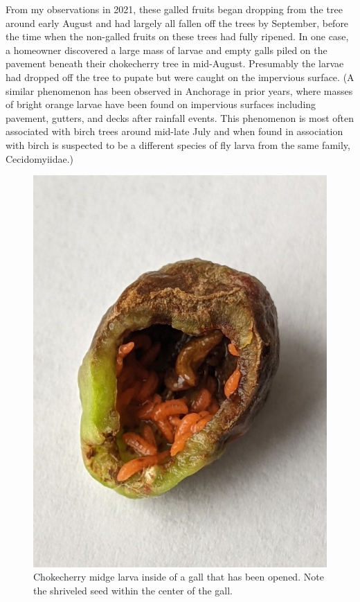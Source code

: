 From my observations in 2021, these galled fruits began dropping from the tree around early August and had largely all fallen off the trees by September, before the time when the non-galled fruits on these trees had fully ripened. In one case, a homeowner discovered a large mass of larvae and empty galls piled on the pavement beneath their chokecherry tree in mid-August. Presumably the larvae had dropped off the tree to pupate but were caught on the impervious surface. (A similar phenomenon has been observed in Anchorage in prior years, where masses of bright orange larvae have been found on impervious surfaces including pavement, gutters, and decks after rainfall events. This phenomenon is most often associated with birch trees around mid-late July and when found in association with birch is suspected to be a different species of fly larva from the same family, Cecidomyiidae.)

\begin{figure}[H]
\begin{center}
\vspace{2mm}
\includegraphics[width=\textwidth]{img/midge_larvae.jpg}
\caption{Chokecherry midge larva inside of a gall that has been opened. Note the shriveled seed within the center of the gall.}
\label{midge_larvae}
\end{center}
\end{figure}


